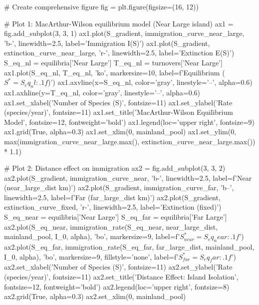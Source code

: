 \documentclass[a4paper, 11pt]{article}
\begin{document}
\begin{pycode}
# Create comprehensive figure
fig = plt.figure(figsize=(16, 12))

# Plot 1: MacArthur-Wilson equilibrium model (Near Large island)
ax1 = fig.add_subplot(3, 3, 1)
ax1.plot(S_gradient, immigration_curve_near_large, 'b-', linewidth=2.5, label='Immigration I(S)')
ax1.plot(S_gradient, extinction_curve_near_large, 'r-', linewidth=2.5, label='Extinction E(S)')
S_eq_nl = equilibria['Near Large']
T_eq_nl = turnovers['Near Large']
ax1.plot(S_eq_nl, T_eq_nl, 'ko', markersize=10, label=f'Equilibrium ($S^* = {S_eq_nl:.1f}$)')
ax1.axvline(x=S_eq_nl, color='gray', linestyle='--', alpha=0.6)
ax1.axhline(y=T_eq_nl, color='gray', linestyle='--', alpha=0.6)
ax1.set_xlabel('Number of Species (S)', fontsize=11)
ax1.set_ylabel('Rate (species/year)', fontsize=11)
ax1.set_title('MacArthur-Wilson Equilibrium Model', fontsize=12, fontweight='bold')
ax1.legend(loc='upper right', fontsize=9)
ax1.grid(True, alpha=0.3)
ax1.set_xlim(0, mainland_pool)
ax1.set_ylim(0, max(immigration_curve_near_large.max(), extinction_curve_near_large.max()) * 1.1)

# Plot 2: Distance effect on immigration
ax2 = fig.add_subplot(3, 3, 2)
ax2.plot(S_gradient, immigration_curve_near, 'b-', linewidth=2.5, label=f'Near ({near_large_dist} km)')
ax2.plot(S_gradient, immigration_curve_far, 'b--', linewidth=2.5, label=f'Far ({far_large_dist} km)')
ax2.plot(S_gradient, extinction_curve_fixed, 'r-', linewidth=2.5, label='Extinction (fixed)')
S_eq_near = equilibria['Near Large']
S_eq_far = equilibria['Far Large']
ax2.plot(S_eq_near, immigration_rate(S_eq_near, near_large_dist, mainland_pool, I_0, alpha),
         'bo', markersize=9, label=f'$S^*_{{near}} = {S_eq_near:.1f}$')
ax2.plot(S_eq_far, immigration_rate(S_eq_far, far_large_dist, mainland_pool, I_0, alpha),
         'bo', markersize=9, fillstyle='none', label=f'$S^*_{{far}} = {S_eq_far:.1f}$')
ax2.set_xlabel('Number of Species (S)', fontsize=11)
ax2.set_ylabel('Rate (species/year)', fontsize=11)
ax2.set_title('Distance Effect: Island Isolation', fontsize=12, fontweight='bold')
ax2.legend(loc='upper right', fontsize=8)
ax2.grid(True, alpha=0.3)
ax2.set_xlim(0, mainland_pool)


\end{pycode}
\end{document}
